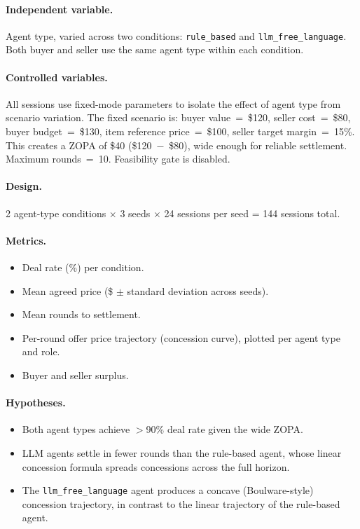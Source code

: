\paragraph{Independent variable.}
Agent type, varied across two conditions: \texttt{rule\_based} and \texttt{llm\_free\_language}.  Both buyer and seller use the same agent type within each condition.

\paragraph{Controlled variables.}
All sessions use fixed-mode parameters to isolate the effect of agent type from scenario variation.  The fixed scenario is: buyer value~=~\$120, seller cost~=~\$80, buyer budget~=~\$130, item reference price~=~\$100, seller target margin~=~15\%.  This creates a ZOPA of \$40 (\$120~$-$~\$80), wide enough for reliable settlement.  Maximum rounds~=~10.  Feasibility gate is disabled.

\paragraph{Design.}
2 agent-type conditions $\times$ 3 seeds $\times$ 24 sessions per seed = 144 sessions total.

\paragraph{Metrics.}
\begin{itemize}
    \item Deal rate (\%) per condition.
    \item Mean agreed price (\$ $\pm$ standard deviation across seeds).
    \item Mean rounds to settlement.
    \item Per-round offer price trajectory (concession curve), plotted per agent type and role.
    \item Buyer and seller surplus.
\end{itemize}

\paragraph{Hypotheses.}
\begin{itemize}
    \item[\textbf{H-A1.}] Both agent types achieve $>$90\% deal rate given the wide ZOPA.
    \item[\textbf{H-A2.}] LLM agents settle in fewer rounds than the rule-based agent, whose linear concession formula spreads concessions across the full horizon.
    \item[\textbf{H-A3.}] The \texttt{llm\_free\_language} agent produces a concave (Boulware-style) concession trajectory, in contrast to the linear trajectory of the rule-based agent.
\end{itemize}

